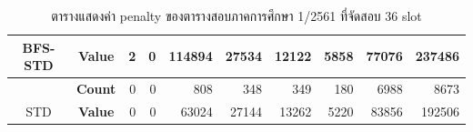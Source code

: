 \begin{table}[]
{\begin{tabular}{@{}ccrrrrrrrr@{}}
    \multirow{-2}{*}{BFS-STD}                    & \textbf{Value}                        & 2                              & 0                              & 114894                         & 27534                          & 12122                          & 5858                           & 77076                          & 237486                           \\ \midrule
    {\color[HTML]{FE0000} }                      & {\color[HTML]{FE0000} \textbf{Count}} & {\color[HTML]{FE0000} 0}       & {\color[HTML]{FE0000} 0}       & {\color[HTML]{FE0000} 808}     & {\color[HTML]{FE0000} 348}     & {\color[HTML]{FE0000} 349}     & {\color[HTML]{FE0000} 180}     & {\color[HTML]{FE0000} 6988}    & {\color[HTML]{FE0000} 8673}      \\ \cmidrule(l){2-10} 
    \multirow{-2}{*}{{\color[HTML]{FE0000} STD}} & {\color[HTML]{FE0000} \textbf{Value}} & {\color[HTML]{FE0000} 0}       & {\color[HTML]{FE0000} 0}       & {\color[HTML]{FE0000} 63024}   & {\color[HTML]{FE0000} 27144}   & {\color[HTML]{FE0000} 13262}   & {\color[HTML]{FE0000} 5220}    & {\color[HTML]{FE0000} 83856}   & {\color[HTML]{FE0000} 192506}    \\ \bottomrule
    \end{tabular}%
    }
    \caption{ตารางแสดงค่า penalty ของตารางสอบภาคการศึกษา 1/2561 ที่จัดสอบ 36 slot}
    \label{tab:result_table_161_36}
\end{table}
